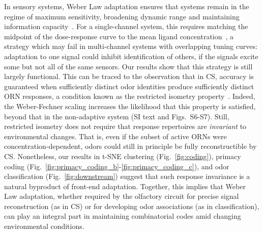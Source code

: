 \documentclass[9pt,twocolumn,twoside]{pnas-new}
\begin{document}
In sensory systems, Weber Law adaptation ensures that systems remain in the regime of maximum sensitivity, broadening dynamic range and maintaining information capacity~\cite{adaptation_fairhall}.
For a single-channel system, this requires matching the midpoint of the dose-response curve to the mean ligand concentration~\cite{information_theory_adaptation}, a strategy which may fail in multi-channel systems with overlapping tuning curves: adaptation to one signal could inhibit identification of others, if the signals excite some but not all of the same sensors. 
Our results show that this strategy is still largely functional. This can be traced to the observation that in CS, accuracy is guaranteed when sufficiently distinct odor identities produce sufficiently distinct ORN responses, a condition known as the restricted isometry property~\cite{CS_tao}. Indeed, the Weber-Fechner scaling increases the likelihood that this property  is satisfied, beyond that in the non-adaptive system (SI text and Figs.~S6-S7). Still, restricted isometry does not require that response repertoires are \textit{invariant} to environmental changes. That is, even if the subset of active ORNs were concentration-dependent, odors could still in principle be fully reconstructible by CS.
Nonetheless, our results in t-SNE clustering (Fig.~\ref{fig:coding}), primacy coding  (Fig.~\ref{fig:primacy_coding_b}-\ref{fig:primacy_coding_c}), and odor classification (Fig.~\ref{fig:downstream}) suggest that such response invariance is a natural byproduct of front-end adaptation. Together, this implies that Weber Law adaptation, whether required by the olfactory circuit for precise signal reconstruction (as in CS) or for developing odor associations (as in classification), can play an integral part in maintaining combinatorial codes amid changing environmental conditions.


\end{document}
